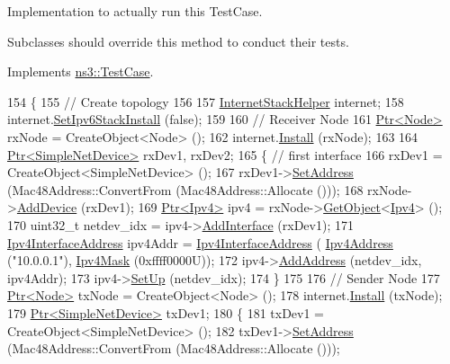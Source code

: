 Implementation to actually run this Test\+Case. 

Subclasses should override this method to conduct their tests. 

Implements \hyperlink{classns3_1_1TestCase_a8ff74680cf017ed42011e4be51917a24}{ns3\+::\+Test\+Case}.


\begin{DoxyCode}
154 \{
155   \textcolor{comment}{// Create topology}
156 
157   \hyperlink{classns3_1_1InternetStackHelper}{InternetStackHelper} internet;
158   internet.\hyperlink{classns3_1_1InternetStackHelper_a5fa8d34e5834305b6aa1b0fe43e1132b}{SetIpv6StackInstall} (\textcolor{keyword}{false});
159 
160   \textcolor{comment}{// Receiver Node}
161   \hyperlink{classns3_1_1Ptr}{Ptr<Node>} rxNode = CreateObject<Node> ();
162   internet.\hyperlink{classns3_1_1InternetStackHelper_a6645b412f31283d2d9bc3d8a95cebbc0}{Install} (rxNode);
163 
164   \hyperlink{classns3_1_1Ptr}{Ptr<SimpleNetDevice>} rxDev1, rxDev2;
165   \{ \textcolor{comment}{// first interface}
166     rxDev1 = CreateObject<SimpleNetDevice> ();
167     rxDev1->\hyperlink{classns3_1_1SimpleNetDevice_a968ef3e7318bac29d5f1d7d977029af4}{SetAddress} (Mac48Address::ConvertFrom (Mac48Address::Allocate ()));
168     rxNode->\hyperlink{classns3_1_1Node_a42ff83ee1d5d1649c770d3f5b62375de}{AddDevice} (rxDev1);
169     \hyperlink{classns3_1_1Ptr}{Ptr<Ipv4>} ipv4 = rxNode->\hyperlink{classns3_1_1Object_a13e18c00017096c8381eb651d5bd0783}{GetObject}<\hyperlink{classns3_1_1Ipv4}{Ipv4}> ();
170     uint32\_t netdev\_idx = ipv4->\hyperlink{classns3_1_1Ipv4_a637354128b71bc587ea5a6eeaef42469}{AddInterface} (rxDev1);
171     \hyperlink{classns3_1_1Ipv4InterfaceAddress}{Ipv4InterfaceAddress} ipv4Addr = \hyperlink{classns3_1_1Ipv4InterfaceAddress}{Ipv4InterfaceAddress} (
      \hyperlink{classns3_1_1Ipv4Address}{Ipv4Address} (\textcolor{stringliteral}{"10.0.0.1"}), \hyperlink{classns3_1_1Ipv4Mask}{Ipv4Mask} (0xffff0000U));
172     ipv4->\hyperlink{classns3_1_1Ipv4_ad203526cae6a4b86f1bb89e44d2b62f7}{AddAddress} (netdev\_idx, ipv4Addr);
173     ipv4->\hyperlink{classns3_1_1Ipv4_a71b2f8acca4923aef907b50b3196bf23}{SetUp} (netdev\_idx);
174   \}
175 
176   \textcolor{comment}{// Sender Node}
177   \hyperlink{classns3_1_1Ptr}{Ptr<Node>} txNode = CreateObject<Node> ();
178   internet.\hyperlink{classns3_1_1InternetStackHelper_a6645b412f31283d2d9bc3d8a95cebbc0}{Install} (txNode);
179   \hyperlink{classns3_1_1Ptr}{Ptr<SimpleNetDevice>} txDev1;
180   \{
181     txDev1 = CreateObject<SimpleNetDevice> ();
182     txDev1->\hyperlink{classns3_1_1SimpleNetDevice_a968ef3e7318bac29d5f1d7d977029af4}{SetAddress} (Mac48Address::ConvertFrom (Mac48Address::Allocate ()));

\end{DoxyCode}
